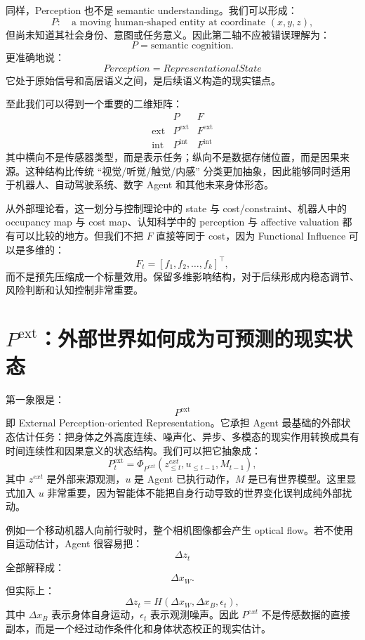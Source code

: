 同样，Perception 也不是 semantic understanding。我们可以形成：
\[
P:
\quad
\text{a moving human-shaped entity at coordinate }(x,y,z),
\]
但尚未知道其社会身份、意图或任务意义。因此第二轴不应被错误理解为：
\[
P=\text{semantic cognition}.
\]
更准确地说：
\[
\boxed{
Perception
=
RepresentationalState
}
\]
它处于原始信号和高层语义之间，是后续语义构造的现实锚点。

至此我们可以得到一个重要的二维矩阵：
\[
\begin{array}{c|cc}
 & P & F\\
\hline
\mathrm{ext}
&
P^{\mathrm{ext}}
&
F^{\mathrm{ext}}
\\
\mathrm{int}
&
P^{\mathrm{int}}
&
F^{\mathrm{int}}
\end{array}
\]
其中横向不是传感器类型，而是表示任务；纵向不是数据存储位置，而是因果来源。这种结构比传统 ``视觉/听觉/触觉/内感'' 分类更加抽象，因此能够同时适用于机器人、自动驾驶系统、数字 Agent 和其他未来身体形态。

从外部理论看，这一划分与控制理论中的 state 与 cost/constraint、机器人中的 occupancy map 与 cost map、认知科学中的 perception 与 affective valuation 都有可以比较的地方。但我们不把 $F$ 直接等同于 cost，因为 Functional Influence 可以是多维的：
\[
F_t
=
[
f_1,f_2,\ldots,f_k]^\top,
\]
而不是预先压缩成一个标量效用。保留多维影响结构，对于后续形成内稳态调节、风险判断和认知控制非常重要。

\section{$P^{\mathrm{ext}}$：外部世界如何成为可预测的现实状态}
\label{sec:external-perception}

第一象限是：
\[
\boxed{
P^{\mathrm{ext}}
}
\]
即 External Perception-oriented Representation。它承担 Agent 最基础的外部状态估计任务：把身体之外高度连续、噪声化、异步、多模态的现实作用转换成具有时间连续性和因果意义的状态结构。我们可以把它抽象成：
\[
P_t^{\mathrm{ext}}
=
\Phi_{P^{ext}}
(
z_{\leq t}^{ext},
u_{\leq t-1},
M_{t-1}
),
\]
其中 $z^{ext}$ 是外部来源观测，$u$ 是 Agent 已执行动作，$M$ 是已有世界模型。这里显式加入 $u$ 非常重要，因为智能体不能把自身行动导致的世界变化误判成纯外部扰动。

例如一个移动机器人向前行驶时，整个相机图像都会产生 optical flow。若不使用自运动估计，Agent 很容易把：
\[
\Delta z_t
\]
全部解释成：
\[
\Delta x_W.
\]
但实际上：
\[
\Delta z_t
=
H(
\Delta x_W,
\Delta x_B,
\epsilon_t
),
\]
其中 $\Delta x_B$ 表示身体自身运动，$\epsilon_t$ 表示观测噪声。因此 $P^{ext}$ 不是传感数据的直接副本，而是一个经过动作条件化和身体状态校正的现实估计。

